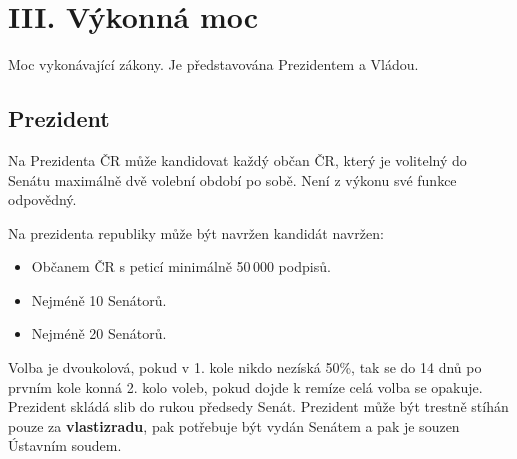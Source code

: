 \documentclass[10pt,a4paper,
twoside,%
]{report}
\begin{document}
\section[III. hlava]{III. Výkonná moc}
Moc vykonávající zákony. Je představována Prezidentem a Vládou.
\subsection{Prezident}
Na Prezidenta ČR může kandidovat každý občan ČR, který je volitelný do Senátu maximálně dvě volební období po sobě. Není z výkonu své funkce odpovědný.

Na prezidenta republiky může být navržen kandidát navržen: \begin{itemize}
\item Občanem ČR s peticí minimálně 50\,000 podpisů.
\item Nejméně 10 Senátorů.
\item Nejméně 20 Senátorů.
\end{itemize}

Volba je dvoukolová, pokud v 1. kole nikdo nezíská 50\%, tak se do 14 dnů po prvním kole konná 2. kolo voleb, pokud dojde k remíze celá volba se opakuje. Prezident skládá slib do rukou předsedy Senát. Prezident může být trestně stíhán pouze za \textbf{vlastizradu}, pak potřebuje být vydán Senátem a pak je souzen Ústavním soudem.
\end{document}
